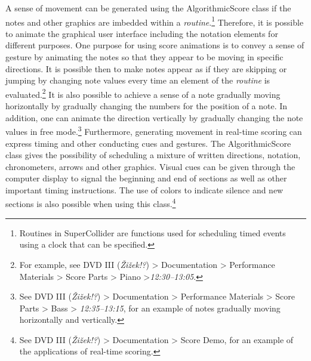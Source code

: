 \hypertarget{algoanimation}{}
A sense of movement can be generated using the AlgorithmicScore class if the notes and other graphics are imbedded within a \emph{routine}.\footnote{Routines in SuperCollider are functions used for scheduling timed events using a clock that can be specified.} Therefore, it is possible to animate the graphical user interface including the notation elements for different purposes. One purpose for using score animations is to convey a sense of gesture by animating the notes so that they appear to be moving in specific directions. It is possible then to make notes appear as if they are skipping or jumping by changing note values every time an element of the \emph{routine} is evaluated.\footnote{For example, see DVD III (\emph{\v{Z}i\v{z}ek!?}) \tiny \textgreater \footnotesize \hspace{0pt} Documentation \tiny \textgreater \footnotesize \hspace{0pt} Performance Materials \tiny \textgreater \footnotesize \hspace{0pt} Score Parts \tiny \textgreater \footnotesize \hspace{0pt} Piano \tiny \textgreater \footnotesize \hspace{0pt}\mbox{\emph{12:30--13:05}}.} It is also possible to achieve a sense of a note gradually moving horizontally by gradually changing the numbers for the position of a note. In addition, one can animate the direction vertically by gradually changing the note values in free mode.\footnote{See DVD III (\emph{\v{Z}i\v{z}ek!?}) \tiny \textgreater \footnotesize \hspace{0pt} Documentation \tiny \textgreater \footnotesize \hspace{0pt} Performance Materials \tiny \textgreater \footnotesize \hspace{0pt} Score Parts \tiny \textgreater \footnotesize \hspace{0pt} Bass \tiny \textgreater \footnotesize \hspace{0pt} \mbox{\emph{12:35--13:15}}, for an example of notes gradually moving horizontally and vertically.} Furthermore, generating movement in real-time scoring can express timing and other conducting cues and gestures. The AlgorithmicScore class gives the possibility of scheduling a mixture of written directions, notation, chronometers, arrows and other graphics.  Visual cues can be given through the computer display to signal the beginning and end of sections as well as other important timing instructions. The use of colors to indicate silence and new sections is also possible when using this class.\footnote{See DVD III (\emph{\v{Z}i\v{z}ek!?}) \tiny \textgreater \footnotesize \hspace{0pt} Documentation \tiny \textgreater \footnotesize \hspace{0pt} Score Demo, for an example of the applications of real-time scoring.} 

